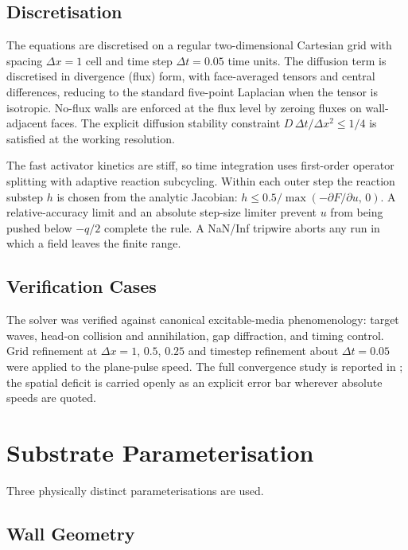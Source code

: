 \subsection{Discretisation}
\label{sec:meth_discretisation}

The equations are discretised on a regular two-dimensional Cartesian grid with spacing $\Delta x = 1$ cell and time step $\Delta t = 0.05$ time units.
The diffusion term is discretised in divergence (flux) form, with face-averaged tensors and central differences, reducing to the standard five-point Laplacian when the tensor is isotropic.
No-flux walls are enforced at the flux level by zeroing fluxes on wall-adjacent faces.
The explicit diffusion stability constraint $D\,\Delta t / \Delta x^{2} \leq 1/4$ is satisfied at the working resolution.

The fast activator kinetics are stiff, so time integration uses first-order operator splitting with adaptive reaction subcycling.
Within each outer step the reaction substep $h$ is chosen from the analytic Jacobian: $h \leq 0.5 / \max(-\partial F/\partial u,\,0)$.
A relative-accuracy limit and an absolute step-size limiter prevent $u$ from being pushed below $-q/2$ complete the rule.
A NaN/Inf tripwire aborts any run in which a field leaves the finite range.

\subsection{Verification Cases}
\label{sec:meth_verification}

The solver was verified against canonical excitable-media phenomenology: target waves, head-on collision and annihilation, gap diffraction, and timing control.
Grid refinement at $\Delta x = 1$, $0.5$, $0.25$ and timestep refinement about $\Delta t = 0.05$ were applied to the plane-pulse speed.
The full convergence study is reported in ; the spatial deficit is carried openly as an explicit error bar wherever absolute speeds are quoted.

\section{Substrate Parameterisation}
\label{sec:meth_parameterisation}

Three physically distinct parameterisations are used.

\subsection{Wall Geometry}
\label{sec:meth_walls}


